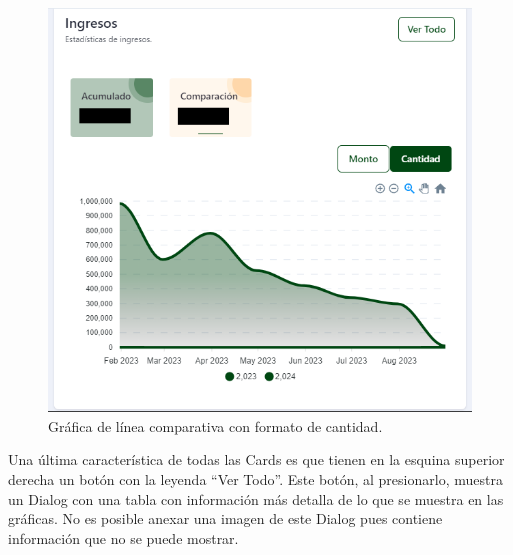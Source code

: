     \begin{figure}[H]
        \begin{center}
            \includegraphics[scale=0.40]{img/actividades/dahsboard-admin/ingreso-comp-cantidad.png}
            \caption{Gráfica de línea comparativa con formato de cantidad.}
            \label{fig:ingreso-comp-cantidad}
        \end{center}
    \end{figure}

Una última característica de todas las Cards es que tienen en la esquina superior derecha un botón con la leyenda ``Ver Todo''. Este botón, al presionarlo, muestra un Dialog con una tabla con información más detalla de lo que se muestra en las gráficas. No es posible anexar una imagen de este Dialog pues contiene información que no se puede mostrar.

